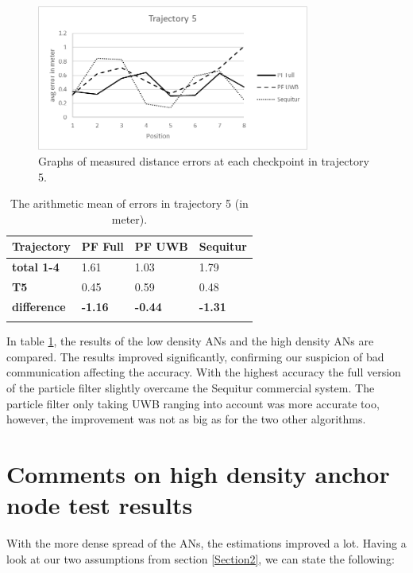 \begin{figure}[th]
\centering
\includegraphics[width=0.8\textwidth]{Figures/trajectory5_results}
\decoRule
\caption[Positioning results trajectory 5]{Graphs of measured distance errors at each checkpoint in trajectory 5.}
\label{fig:trajectory5_results}
\end{figure}

\begin{table}
\caption{The arithmetic mean of errors in trajectory 5 (in meter).}
\label{tab:arithmetic_errors_trajectory5}
\centering
\begin{tabular}{l l l l}
\toprule
\textbf{Trajectory} & \textbf{PF Full} & \textbf{PF UWB} & \textbf{Sequitur}\\
\midrule
\textbf{total 1-4} & 1.61 & 1.03 & 1.79\\
\textbf{T5} & 0.45 & 0.59 & 0.48\\
\midrule
\textbf{difference}  & \textbf{-1.16} & \textbf{-0.44} & \textbf{-1.31}\\
\bottomrule\\
\end{tabular}
\end{table}

In table \ref{tab:arithmetic_errors_trajectory5}, the results of the low density ANs and the high density ANs are compared. The results improved significantly, confirming our suspicion of bad communication affecting the accuracy. With the highest accuracy the full version of the particle filter slightly overcame the Sequitur commercial system. The particle filter only taking UWB ranging into account was more accurate too, however, the improvement was not as big as for the two other algorithms.


\section{Comments on high density anchor node test results}
\label{Section4}
With the more dense spread of the ANs, the estimations improved a lot. Having a look at our two assumptions from section \ref{Section2}, we can state the following:

